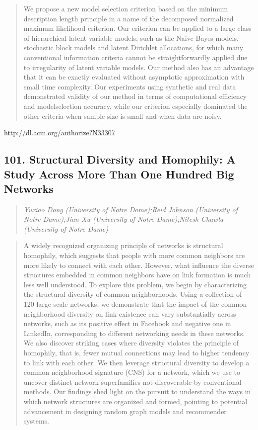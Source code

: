 \documentclass{article}
\begin{document}
\begin{quote}
We propose a new model selection criterion based on the minimum description length principle in a name of the decomposed normalized maximum likelihood criterion. Our criterion can be applied to a large class of hierarchical latent variable models, such as the Naive Bayes models, stochastic block models and latent Dirichlet allocations, for which many conventional information criteria cannot be straightforwardly applied due to irregularity of latent variable models. Our method also has an advantage that it can be exactly evaluated without asymptotic approximation with small time complexity. Our experiments using synthetic and real data demonstrated validity of our method in terms of computational efficiency and modelselection accuracy, while our criterion especially dominated the other criteria when sample size is small and when data are noisy.
\end{quote}

\href{http://dl.acm.org/authorize?N33307}{http://dl.acm.org/authorize?N33307}

\subsection{101. Structural Diversity and Homophily: A Study Across More Than One Hundred Big Networks}

\begin{quote}
\footnotesize{\textit{Yuxiao Dong (University of Notre Dame);Reid Johnson (University of Notre Dame);Jian Xu (University of Notre Dame);Nitesh Chawla (University of Notre Dame)}}

\end{quote}

\begin{quote}
A widely recognized organizing principle of networks is structural homophily, which suggests that people with more common neighbors are more likely to connect with each other. However, what influence the diverse structures embedded in common neighbors have on link formation is much less well understood. To explore this problem, we begin by characterizing the structural diversity of common neighborhoods. Using a collection of 120 large-scale networks, we demonstrate that the impact of the common neighborhood diversity on link existence can vary substantially across networks, such as its positive effect in Facebook and negative one in LinkedIn, corresponding to different networking needs in these networks. We also discover striking cases where diversity violates the principle of homophily, that is, fewer mutual connections may lead to higher tendency to link with each other. We then leverage structural diversity to develop a common neighborhood signature (CNS) for a network, which we use to uncover distinct network superfamilies not discoverable by conventional methods. Our findings shed light on the pursuit to understand the ways in which network structures are organized and formed, pointing to potential advancement in designing random graph models and recommender systems.
\end{quote}
\end{document}
